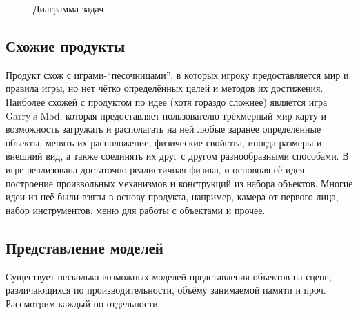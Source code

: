 \documentclass[a4paper,12pt]{report}
\numberwithin{equation}{section}
\begin{document}
\begin{figure}[!h]
\centering
{}
\caption{Диаграмма задач}
\label{taskhierarchy}
\end{figure}

\subsection{Схожие продукты}
Продукт схож с играми-``песочницами'', в которых игроку предоставляется мир и правила игры, но нет чётко определённых целей и методов их достижения. Наиболее схожей с продуктом по идее (хотя гораздо сложнее) является игра Garry's Mod, которая предоставляет пользователю трёхмерный мир-карту и возможность загружать и располагать на ней любые заранее определённые объекты, менять их расположение, физические свойства, иногда размеры и внешний вид, а также соединять их друг с другом разнообразными способами. В игре реализована достаточно реалистичная физика, и основная её идея --- построение произвольных механизмов и конструкций из набора объектов. Многие идеи из неё были взяты в основу продукта, например, камера от первого лица, набор инструментов, меню для работы с объектами и прочее.

\subsection{Представление моделей} \label{model_reasoning_section}
Существует несколько возможных моделей представления объектов на сцене, различающихся по производительности, объёму занимаемой памяти и проч. Рассмотрим каждый по отдельности.
\end{document}
